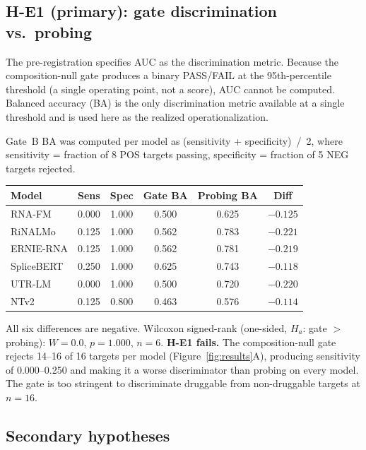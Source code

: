 \documentclass[11pt]{article}
\begin{document}
\subsection{H-E1 (primary): gate discrimination vs.\ probing}

The pre-registration specifies AUC as the discrimination metric. Because the
composition-null gate produces a binary PASS/FAIL at the 95th-percentile
threshold (a single operating point, not a score), AUC cannot be computed.
Balanced accuracy (BA) is the only discrimination metric available at a
single threshold and is used here as the realized operationalization.

Gate~B BA was computed per model as (sensitivity + specificity)~/~2, where
sensitivity = fraction of 8 POS targets passing, specificity = fraction of 5
NEG targets rejected.

\begin{center}
\begin{tabular}{lccccc}
\toprule
\textbf{Model} & \textbf{Sens} & \textbf{Spec} & \textbf{Gate BA} & \textbf{Probing BA} & \textbf{Diff} \\
\midrule
RNA-FM      & 0.000 & 1.000 & 0.500 & 0.625 & $-0.125$ \\
RiNALMo     & 0.125 & 1.000 & 0.562 & 0.783 & $-0.221$ \\
ERNIE-RNA   & 0.125 & 1.000 & 0.562 & 0.781 & $-0.219$ \\
SpliceBERT  & 0.250 & 1.000 & 0.625 & 0.743 & $-0.118$ \\
UTR-LM      & 0.000 & 1.000 & 0.500 & 0.720 & $-0.220$ \\
NTv2        & 0.125 & 0.800 & 0.463 & 0.576 & $-0.114$ \\
\bottomrule
\end{tabular}
\end{center}

All six differences are negative. Wilcoxon signed-rank (one-sided, $H_a$:
gate $>$ probing): $W = 0.0$, $p = 1.000$, $n = 6$. \textbf{H-E1 fails.}
The composition-null gate rejects 14--16 of 16 targets per model
(Figure~\ref{fig:results}A), producing sensitivity of 0.000--0.250 and
making it a worse discriminator than probing on every model. The gate is too stringent to discriminate druggable from
non-druggable targets at $n = 16$.

\subsection{Secondary hypotheses}
\end{document}
